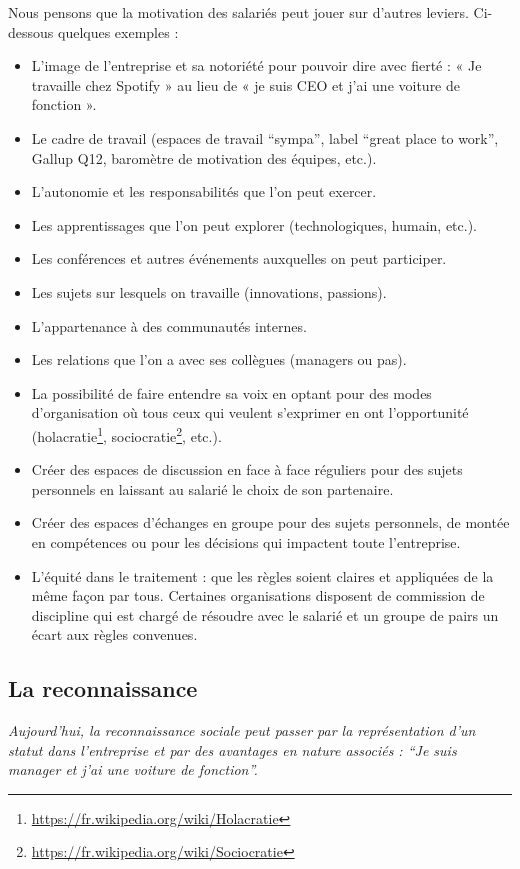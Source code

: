 \documentclass[12pt]{article}
\newcommand{\actuel}[1]{%
  \begin{tcolorbox}[colframe=DarkButter,boxrule=2pt,arc=4pt,left=6pt,right=6pt,top=6pt,bottom=6pt,boxsep=0pt,colback=Aluminium2]
    \textit{#1}
  \end{tcolorbox}
}
\begin{document}
 Nous pensons que la motivation des salariés peut jouer sur d’autres leviers. Ci-dessous quelques exemples :
 \begin{itemize}
   \item L’image de l’entreprise et sa notoriété pour pouvoir dire avec fierté : « Je travaille chez Spotify » au lieu de « je suis CEO et j’ai une voiture de fonction ».
   \item Le cadre de travail (espaces de travail “sympa”, label “great place to work”, Gallup Q12, baromètre de motivation des équipes, etc.).
   \item L’autonomie et les responsabilités que l’on peut exercer.
   \item Les apprentissages que l’on peut explorer (technologiques, humain, etc.).
   \item Les conférences et autres événements auxquelles on peut participer.
   \item Les sujets sur lesquels on travaille (innovations, passions).
   \item L’appartenance à des communautés internes.
   \item Les relations que l’on a avec ses collègues (managers ou pas).
   \item La possibilité de faire entendre sa voix en optant pour des modes d’organisation où tous ceux qui veulent s’exprimer en ont l’opportunité (holacratie\footnote{\url{https://fr.wikipedia.org/wiki/Holacratie}}, sociocratie\footnote{\url{https://fr.wikipedia.org/wiki/Sociocratie}}, etc.).
   \item Créer des espaces de discussion en face à face réguliers pour des sujets personnels en laissant au salarié le choix de son partenaire.
   \item Créer des espaces d’échanges en groupe pour des sujets personnels, de montée en compétences ou pour les décisions qui impactent toute l’entreprise.
   \item L’équité dans le traitement : que les règles soient claires et appliquées de la même façon par tous. Certaines organisations disposent de commission de discipline qui est chargé de résoudre avec le salarié et un groupe de pairs un écart aux règles convenues.
 \end{itemize}

\subsection{La reconnaissance}
 \actuel{Aujourd’hui, la reconnaissance sociale peut passer par la représentation d’un statut dans l’entreprise et par des avantages en nature associés : “Je suis manager et j’ai une voiture de fonction”.}
\end{document}
